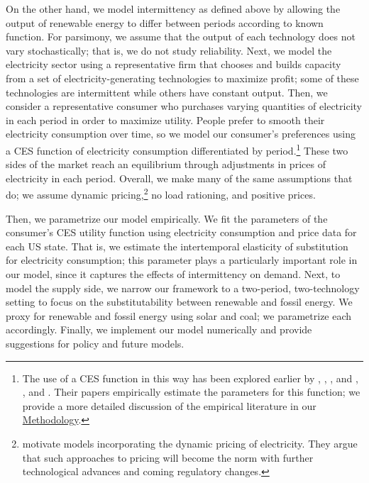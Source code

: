 \documentclass[11pt,a4paper,leqno]{extarticle}
\begin{document}
	On the other hand,  we model intermittency as defined above by allowing the output of renewable energy to differ between periods according to known function. For parsimony, we assume that the output of each technology  does not vary stochastically; that is, we do not study reliability. Next, we model the electricity sector using a representative firm that chooses and builds capacity from a set of electricity-generating technologies to maximize profit; some of these technologies are intermittent while others have constant output. Then, we consider a representative consumer who purchases varying quantities of electricity in each period in order to maximize utility. People prefer to smooth their electricity consumption over time, so we model our consumer's preferences using a CES function of electricity consumption differentiated by period.\footnote{ The use of a CES function in this way has been explored earlier by \citet{Schwarz}, \citet{Schwarz}, \citet{Herriges}, and \citet{KS1994}, \citet{Aubin}, and \citet{Moha2016}. Their papers empirically estimate the parameters for this function; we provide a more detailed discussion of the empirical literature in our \hyperref[sec:methodology]{Methodology}.} These two sides of the market reach an equilibrium through adjustments in prices of electricity in each period. Overall, we make many of the same assumptions that \citet{HH} do; we assume dynamic pricing,\footnote{ \citeauthor{HH} motivate models incorporating the dynamic pricing of electricity. They argue that such approaches to pricing will become the norm with further technological advances and coming regulatory changes.} no load rationing, and positive prices. 
	
	Then, we parametrize our model empirically. We fit the parameters of the consumer's CES utility function using electricity consumption and price data for each US state. That is, we estimate the intertemporal elasticity of substitution for electricity consumption; this parameter plays a particularly important role in our model, since it captures the effects of intermittency on demand. Next, to model the supply side, we narrow our framework to a two-period, two-technology setting to focus on the substitutability between renewable and fossil energy. We proxy for renewable and fossil energy using solar and coal; we parametrize each accordingly. Finally, we implement our model numerically and provide suggestions for policy and future models. 
	
\end{document}
